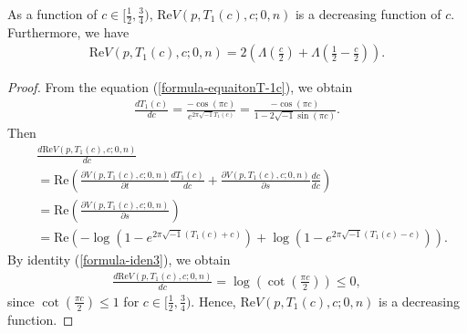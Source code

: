 \documentclass[12pt]{amsart}
\begin{document}
\begin{lemma} \label{lemma-ReVTc}
    As a function of $c\in [\frac{1}{2},\frac{3}{4})$, $\text{Re} V(p,T_1(c),c;0,n)$ is a decreasing function of $c$. Furthermore, we have 
\begin{align}
    \text{Re} V(p,T_1(c),c;0,n)=2\left(\Lambda\left(\frac{c}{2}\right)+\Lambda\left(\frac{1}{2}-\frac{c}{2}\right)\right).
\end{align}
\end{lemma}

\begin{proof}
From the equation (\ref{formula-equaitonT-1c}), we obtain 
\begin{align}
    \frac{dT_1(c)}{dc}=\frac{-\cos(\pi c)}{e^{2\pi \sqrt{-1}T_1(c)}}=\frac{-\cos(\pi c)}{1-2\sqrt{-1}\sin(\pi c)}.
\end{align}
Then 
\begin{align}
    &\frac{d \text{Re} V(p,T_1(c),c;0,n)}{dc}\\\nonumber
    &=\text{Re}\left(\frac{\partial V(p,T_1(c),c;0,n)}{\partial t}\frac{dT_1(c)}{dc}+\frac{\partial V(p,T_1(c),c;0,n)}{\partial s}\frac{dc}{dc}\right)\\\nonumber
    &=\text{Re}\left(\frac{\partial V(p,T_1(c),c;0,n)}{\partial s}\right)\\\nonumber
    &=\text{Re}\left(-\log(1-e^{2\pi\sqrt{-1}(T_1(c)+c)})+\log\left(1-e^{2\pi\sqrt{-1}(T_1(c)-c)}\right)\right).
\end{align}
By identity (\ref{formula-iden3}), we obtain 
\begin{align}
    \frac{d \text{Re} V(p,T_1(c),c;0,n)}{dc}=\log\left(\cot\left(\frac{\pi c}{2}\right)\right)\leq 0,
\end{align}
since $\cot\left(\frac{\pi c}{2}\right)\leq 1$ for $c\in [\frac{1}{2},\frac{3}{4})$. Hence, $\text{Re} V(p,T_1(c),c;0,n)$ is a decreasing function. 


\end{proof}
\end{document}
